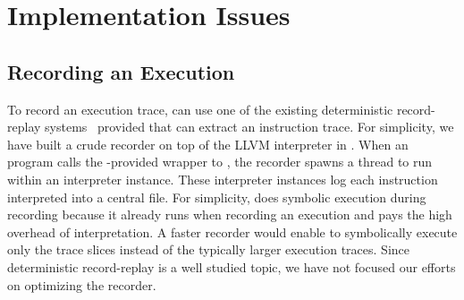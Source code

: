 \section{Implementation Issues} \label{sec:impl}


\subsection{Recording an Execution} \label{sec:record}

To record an execution trace, \peregrine can use one of the existing
deterministic record-replay
systems~\cite{scribe:sigmetrics10,smp-revirt:vee08,idna:vee06} provided
that \peregrine can extract an instruction trace.  For simplicity, we have built
a crude recorder on top of the LLVM interpreter in \klee.  When an program
calls the \peregrine-provided wrapper to ,
the recorder spawns a thread to run 
within an interpreter instance.  These interpreter instances log
each instruction interpreted into a central file.
For simplicity, \peregrine does symbolic execution during recording because it
already runs \klee when recording an execution and pays the high overhead
of interpretation.  A faster recorder would enable \peregrine to
symbolically execute only the trace slices instead of the typically larger
execution traces.  Since deterministic record-replay is a well
studied topic, we have not focused our efforts on optimizing the recorder.




